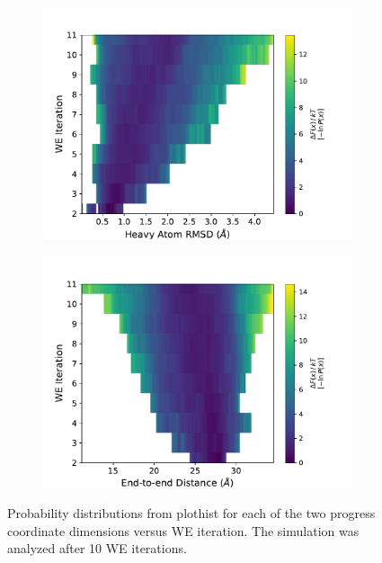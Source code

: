 \documentclass[9pt,tutorial,ASAPversion]{livecoms}
\begin{document}
\begin{figure}
\centering
\begin{subfigure}[A]{0.35\textwidth}
\includegraphics[width=\linewidth]{Figure6A.pdf}
\end{subfigure}
\begin{subfigure}[B]{0.35\textwidth}
\includegraphics[width=\linewidth]{Figure6B.pdf}
\end{subfigure}
\caption{Probability distributions from plothist for each of the two progress coordinate dimensions versus WE iteration. 
The simulation was analyzed after 10 WE iterations.}
\label{fig:view}
\end{figure}
\end{document}
